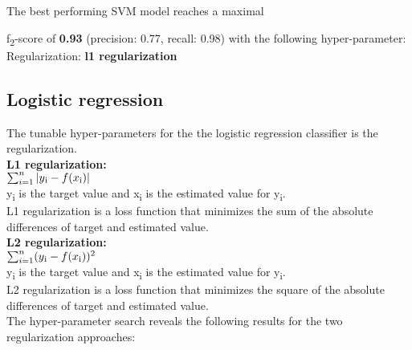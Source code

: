 The best performing SVM model reaches a maximal {f\textsubscript{2}-score of \textbf{0.93} (precision:  0.77, recall: 0.98) with the following hyper-parameter:\\
Regularization: \qquad  \qquad \textbf{l1 regularization}

\subsection*{Logistic regression}
The tunable hyper-parameters for the the logistic regression classifier is the regularization. 
\\
\textbf{L1 regularization:}\\
$\sum_{i=1}^{n}|y\textsubscript{i}-f(x\textsubscript{i})| $ \\
 y\textsubscript{i} is the target value and x\textsubscript{i} is the estimated value for y\textsubscript{i}.\\
 L1 regularization is a loss function that minimizes the sum of the absolute differences of target and estimated value.
\\
\textbf{L2 regularization:}  \\
$\sum_{i=1}^{n}(y\textsubscript{i}-f(x\textsubscript{i}))^2 $ \\
 y\textsubscript{i} is the target value and x\textsubscript{i} is the estimated value for y\textsubscript{i}.\\
 L2 regularization is a loss function that minimizes the square of the absolute differences of target and estimated value.
\\

The hyper-parameter search reveals the following results for the two regularization approaches: \\

\pgfplotsset{width=1.1\textwidth, height=0.5\textwidth}

\\


}
